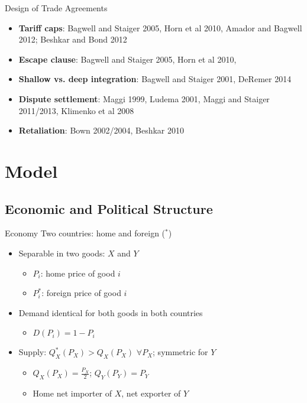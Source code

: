 \documentclass[handout]{beamer}
\begin{document}
 
\begin{frame}{Design of Trade Agreements}
\pause
\begin{itemize}[<+->]
	\item \textbf{Tariff caps}: Bagwell and Staiger 2005, Horn et al 2010, Amador and Bagwell 2012; Beshkar and Bond 2012
	\item \textbf{Escape clause}: Bagwell and Staiger 2005, Horn et al 2010, 
	\item \textbf{Shallow vs. deep integration}: Bagwell and Staiger 2001, DeRemer 2014
	\item \textbf{Dispute settlement}: Maggi 1999, Ludema 2001, Maggi and Staiger 2011/2013, Klimenko et al 2008
	\item \textbf{Retaliation}: Bown 2002/2004, Beshkar 2010
\end{itemize}
\end{frame} 





\section{Model}
\subsection{Economic and Political Structure}
\begin{frame}{Economy}
Two countries: home and foreign (${}^*$)
\pause
\begin{itemize}[<+->]
	\item Separable in two goods: $X$ and $Y$
			\begin{itemize}
				\item $P_i$: home price of good $i$
				\item $P_i^*$: foreign price of good $i$
			\end{itemize}
	\item Demand identical for both goods in both countries
		\begin{itemize}
			\item $D(P_i) = 1 - P_i$
		\end{itemize}
	\item Supply: $Q_X^*(P_X) > Q_X(P_X)$ $\forall P_X$; symmetric for $Y$ 
		\begin{itemize}
			\item $Q_X(P_X) = \frac{P_X}{2}$; $Q_Y(P_Y) = P_Y$
			\item Home net importer of $X$, net exporter of $Y$
		\end{itemize}
\end{itemize}

\end{frame}
\end{document}
